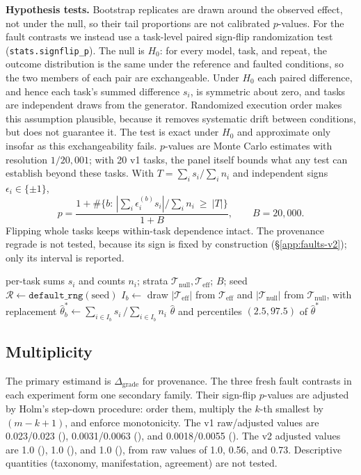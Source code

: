 \textbf{Hypothesis tests.} Bootstrap replicates are drawn around the observed
effect, not under the null, so their tail proportions are not calibrated
$p$-values. For the fault contrasts we instead use a task-level paired
sign-flip randomization test (\texttt{stats.signflip\_p}). The null is
$H_0$: for every model, task, and repeat, the outcome distribution is the same
under the reference and faulted conditions, so the two members of each pair
are exchangeable. Under $H_0$ each paired difference, and hence each task's
summed difference $s_i$, is symmetric about zero, and tasks are independent
draws from the generator. Randomized execution order makes this assumption
plausible, because it removes systematic drift between conditions, but does
not guarantee it. The test is exact under $H_0$ and approximate only insofar
as this exchangeability fails. $p$-values are Monte Carlo estimates with resolution
$1/20{,}001$; with 20 v1 tasks, the panel itself bounds what any test can
establish beyond these tasks. With
$T=\sum_i s_i/\sum_i n_i$ and independent signs $\epsilon_i\in\{\pm1\}$,
\begin{equation}
p=\frac{1+\#\{b:\,|\textstyle\sum_i\epsilon^{(b)}_i s_i|/\sum_i n_i\ \ge\ |T|\}}{1+B},\qquad B=20{,}000.
\end{equation}
Flipping whole tasks keeps within-task dependence intact. The provenance
regrade is not tested, because its sign is fixed by construction
(\S\ref{app:faults-v2}); only its interval is reported.

\begin{algorithm}[h]
\caption{Stratified task-cluster bootstrap (\texttt{research\_v2/stats.py})}
\label{alg:boot}
\begin{algorithmic}[1]
\Require per-task sums $s_i$ and counts $n_i$; strata $\mathcal{T}_{\text{null}},\mathcal{T}_{\text{eff}}$; $B$; seed
\State $\mathcal{R}\gets\texttt{default\_rng}(\text{seed})$
  \State $I_b\gets$ draw $|\mathcal{T}_{\text{eff}}|$ from $\mathcal{T}_{\text{eff}}$ and $|\mathcal{T}_{\text{null}}|$ from $\mathcal{T}_{\text{null}}$, with replacement
  \State $\hat\theta^*_b\gets\sum_{i\in I_b}s_i\,/\sum_{i\in I_b}n_i$ 
\EndFor
\State \Return $\hat\theta$ and percentiles $(2.5, 97.5)$ of $\hat\theta^*$
\end{algorithmic}
\end{algorithm}

\subsection{Multiplicity}
\label{app:stats-holm}
The primary estimand is $\hat\Delta_{\text{grade}}$ for provenance. The three
fresh fault contrasts in each experiment form one secondary family. Their
sign-flip $p$-values are adjusted by Holm's step-down procedure: order them,
multiply the $k$-th smallest by $(m-k+1)$, and enforce monotonicity. The v1
raw/adjusted values are 0.023/0.023 (), 0.0031/0.0063
(), and 0.0018/0.0055 (). The v2 adjusted values are
1.0 (), 1.0 (), and 1.0 (),
from raw values of 1.0, 0.56, and 0.73. Descriptive quantities (taxonomy, manifestation,
agreement) are not tested.

